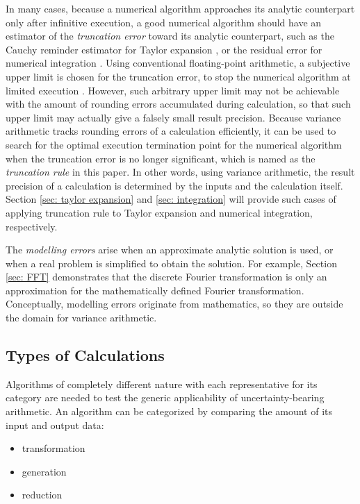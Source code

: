 \documentclass[twoside]{article}
\numberwithin{equation}{section}
\begin{document}
In many cases, because a numerical algorithm approaches its analytic counterpart only after infinitive execution, a good numerical algorithm should have an estimator of the \emph{truncation error} toward its analytic counterpart, such as the Cauchy reminder estimator for Taylor expansion \cite{Numerical_Recipes}, or the residual error for numerical integration \cite{Numerical_Recipes}.  
Using conventional floating-point arithmetic, a subjective upper limit is chosen for the truncation error, to stop the numerical algorithm at limited execution \cite{Numerical_Recipes}. 
However, such arbitrary upper limit may not be achievable with the amount of rounding errors accumulated during calculation, so that such upper limit may actually give a falsely small result precision. 
Because variance arithmetic tracks rounding errors of a calculation efficiently, it can be used to search for the optimal execution termination point for the numerical algorithm when the truncation error is no longer significant, which is named as the \emph{truncation rule} in this paper. In other words, using variance arithmetic, the result precision of a calculation is determined by the inputs and the calculation itself.  
Section \ref{sec: taylor expansion} and \ref{sec: integration} will provide such cases of applying truncation rule to Taylor expansion and numerical integration, respectively.

The \emph{modelling errors} arise when an approximate analytic solution is used, or when a real problem is simplified to obtain the solution.  
For example, Section \ref{sec: FFT} demonstrates that the discrete Fourier transformation is only an approximation for the mathematically defined Fourier transformation.  
Conceptually, modelling errors originate from mathematics, so they are outside the domain for variance arithmetic.


\subsection{Types of Calculations}

Algorithms of completely different nature with each representative for its category are needed to test the generic applicability of uncertainty-bearing arithmetic.  
An algorithm can be categorized by comparing the amount of its input and output data:
\begin{itemize}
\item transformation
\item generation
\item reduction
\end{itemize}
\end{document}
